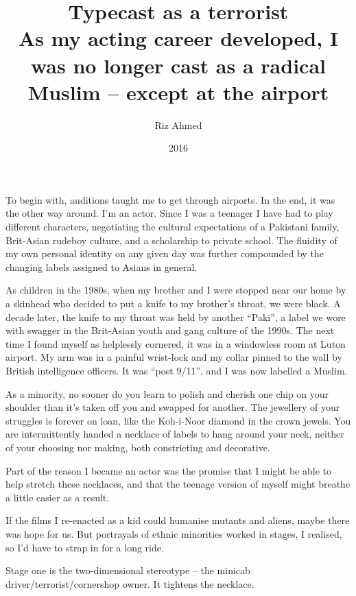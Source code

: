 \documentclass[10pt,a4paper]{article}
\begin{document}
\title{Typecast as a terrorist\\\normalsize As my acting career developed, I was no longer cast as a radical Muslim – except at the airport}
\date{2016}
\author{Riz Ahmed}

\maketitle
\noindent\linenumbers To begin with, auditions taught me to get through airports. In the end, it was the other way around. I’m an actor. Since I was a teenager I have had to play different characters, negotiating the cultural expectations of a Pakistani family, Brit-Asian rudeboy culture, and a scholarship to private school. The fluidity of my own personal identity on any given day was further compounded by the changing labels assigned to Asians in general.

As children in the 1980s, when my brother and I were stopped near our home by a skinhead who decided to put a knife to my brother’s throat, we were black. A decade later, the knife to my throat was held by another “Paki”, a label we wore with swagger in the Brit-Asian youth and gang culture of the 1990s. The next time I found myself as helplessly cornered, it was in a windowless room at Luton airport. My arm was in a painful wrist-lock and my collar pinned to the wall by British intelligence officers. It was “post 9/11”, and I was now labelled a Muslim.

As a minority, no sooner do you learn to polish and cherish one chip on your shoulder than it’s taken off you and swapped for another. The jewellery of your struggles is forever on loan, like the Koh-i-Noor diamond in the crown jewels. You are intermittently handed a necklace of labels to hang around your neck, neither of your choosing nor making, both constricting and decorative.

Part of the reason I became an actor was the promise that I might be able to help stretch these necklaces, and that the teenage version of myself might breathe a little easier as a result.

If the films I re-enacted as a kid could humanise mutants and aliens, maybe there was hope for us. But portrayals of ethnic minorities worked in stages, I realised, so I’d have to strap in for a long ride.

Stage one is the two-dimensional stereotype – the minicab driver/terrorist/cornershop owner. It tightens the necklace.
\end{document}
